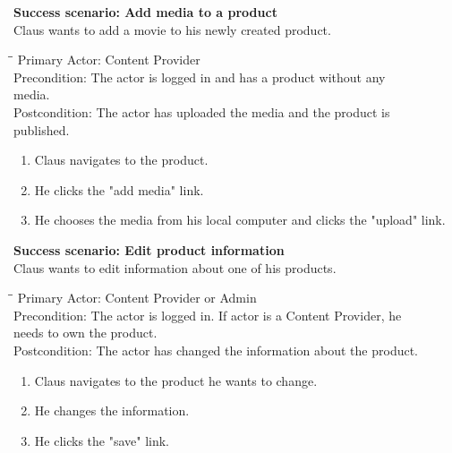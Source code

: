 \vspace{3mm}
\textbf{Success scenario: Add media to a product} \\
Claus wants to add a movie to his newly created product.
\begin{tabbing}
\hspace{5mm}\=\hspace{26mm}\=\kill
\>Primary Actor:\> Content Provider\\
\>Precondition:\> The actor is logged in and has a product without any\\ \hspace{85px} media.\\
\>Postcondition:\> The actor has uploaded the media and the product is\\ \hspace{85px} published.
\end{tabbing}
\begin{enumerate} \setlength{\itemsep}{-1mm}
	\item Claus navigates to the product.
	\item He clicks the "add media" link.
	\item He chooses the media from his local computer and clicks the "upload" link.
\end{enumerate}
\vspace{3mm}
\textbf{Success scenario: Edit product information} \\
Claus wants to edit information about one of his products.
\begin{tabbing}
\hspace{5mm}\=\hspace{26mm}\=\kill
\>Primary Actor:\> Content Provider or Admin\\
\>Precondition:\> The actor is logged in. If actor is a Content Provider, he\\ \hspace{85px} needs to own the product.\\
\>Postcondition:\> The actor has changed the information about the product.
\end{tabbing}
\begin{enumerate} \setlength{\itemsep}{-1mm}
	\item Claus navigates to the product he wants to change.
	\item He changes the information.
	\item He clicks the "save" link.
\end{enumerate}
\vspace{3mm}
